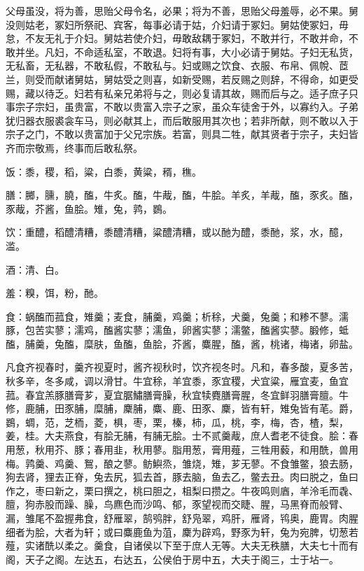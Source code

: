 \documentclass[]{article}
\begin{document}
父母虽没，将为善，思贻父母令名，必果；将为不善，思贻父母羞辱，必不果。舅没则姑老，冢妇所祭祀、宾客，每事必请于姑，介妇请于冢妇。舅姑使冢妇，毋怠，不友无礼于介妇。舅姑若使介妇，毋敢敌耦于冢妇，不敢并行，不敢并命，不敢并坐。凡妇，不命适私室，不敢退。妇将有事，大小必请于舅姑。子妇无私货，无私畜，无私器，不敢私假，不敢私与。妇或赐之饮食、衣服、布帛、佩帨、茝兰，则受而献诸舅姑，舅姑受之则喜，如新受赐，若反赐之则辞，不得命，如更受赐，藏以待乏。妇若有私亲兄弟将与之，则必复请其故，赐而后与之。适子庶子只事宗子宗妇，虽贵富，不敢以贵富入宗子之家，虽众车徒舍于外，以寡约入。子弟犹归器衣服裘衾车马，则必献其上，而后敢服用其次也；若非所献，则不敢以入于宗子之门，不敢以贵富加于父兄宗族。若富，则具二牲，献其贤者于宗子，夫妇皆齐而宗敬焉，终事而后敢私祭。

饭：黍，稷，稻，粱，白黍，黄粱，稰，穛。

膳：膷，臐，膮，醢，牛炙。醢，牛胾，醢，牛脍。羊炙，羊胾，醢，豕炙。醢，豕胾，芥酱，鱼脍。雉，兔，鹑，鷃。

饮：重醴，稻醴清糟，黍醴清糟，粱醴清糟，或以酏为醴，黍酏，浆，水，醷，滥。

酒：清、白。

羞：糗，饵，粉，酏。

食：蜗醢而菰食，雉羹；麦食，脯羹，鸡羹；析稌，犬羹，兔羹；和糁不蓼。濡豚，包苦实蓼；濡鸡，醢酱实蓼；濡鱼，卵酱实蓼；濡鳖，醢酱实蓼。腶修，蚳醢，脯羹，兔醢，糜肤，鱼醢，鱼脍，芥酱，麋腥，醢，酱，桃诸，梅诸，卵盐。

凡食齐视春时，羹齐视夏时，酱齐视秋时，饮齐视冬时。凡和，春多酸，夏多苦，秋多辛，冬多咸，调以滑甘。牛宜稌，羊宜黍，豕宜稷，犬宜粱，雁宜麦，鱼宜菰。春宜羔豚膳膏芗，夏宜腒鱐膳膏臊，秋宜犊麑膳膏腥，冬宜鲜羽膳膏膻。牛修，鹿脯，田豕脯，糜脯，麇脯，麋、鹿、田豕、麇，皆有轩，雉兔皆有芼。爵，鷃，蜩，范，芝栭，菱，椇，枣，栗，榛，柿，瓜，桃，李，梅，杏，楂，梨，姜，桂。大夫燕食，有脍无脯，有脯无脍。士不贰羹胾，庶人耆老不徒食。脍：春用葱，秋用芥、豚；春用韭，秋用蓼。脂用葱，膏用薤，三牲用藙，和用酰，兽用梅。鹑羹、鸡羹、鴽，酿之蓼。鲂鱮烝，雏烧，雉，芗无蓼。不食雏鳖，狼去肠，狗去肾，狸去正脊，兔去尻，狐去首，豚去脑，鱼去乙，鳖去丑。肉曰脱之，鱼曰作之，枣曰新之，栗曰撰之，桃曰胆之，柤梨曰攒之。牛夜鸣则庮，羊泠毛而毳、膻，狗赤股而躁、臊，鸟麃色而沙鸣、郁，豕望视而交睫、腥，马黑脊而般臂、漏，雏尾不盈握弗食，舒雁翠，鹄鸮胖，舒凫翠，鸡肝，雁肾，鸨奥，鹿胃。肉腥细者为脍，大者为轩；或曰麋鹿鱼为菹，麇为辟鸡，野豕为轩，兔为宛脾，切葱若薤，实诸酰以柔之。羹食，自诸侯以下至于庶人无等。大夫无秩膳，大夫七十而有阁，天子之阁。左达五，右达五，公侯伯于房中五，大夫于阁三，士于坫一。
\end{document}
